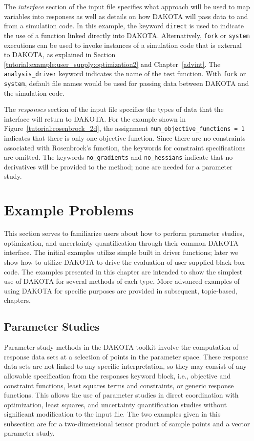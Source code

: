 The \emph{interface} section of the input file specifies what approach
will be used to map variables into responses as well as details on how
DAKOTA will pass data to and from a simulation code.
In this example, the keyword \texttt{direct} is used to indicate the
use of a function linked directly into DAKOTA.
Alternatively, \texttt{fork} or \texttt{system} executions can be used
to invoke instances of a simulation code that is external to DAKOTA,
as explained in Section \ref{tutorial:example:user_supply:optimization2} 
and Chapter~\ref{advint}.
The \texttt{analysis\_driver} keyword indicates the name of the test
function.  With \texttt{fork} or \texttt{system}, default file names
would be used for passing data between DAKOTA and the simulation code.

The \emph{responses} section of the input file specifies the types of
data that the interface will return to DAKOTA. For the example shown
in Figure~\ref{tutorial:rosenbrock_2d}, the assignment
\texttt{num\_objective\_functions = 1}
indicates that there is only one objective
function.  Since there are no constraints
associated with Rosenbrock's function, the keywords for
constraint specifications are omitted. The keywords
\texttt{no\_gradients} and \texttt{no\_hessians} indicate that no
derivatives will be provided to the method; none are needed for
a parameter study.

\section{Example Problems}\label{tutorial:example}

This section serves to familiarize users about how to perform parameter 
studies, optimization, and uncertainty quantification through their common
DAKOTA interface.  The initial examples utilize simple built in driver 
functions; later we show how to utilize DAKOTA to drive the evaluation of 
user supplied black box code.  The examples presented in this chapter 
are intended to show the simplest use of DAKOTA for several methods of 
each type.  More advanced examples of using DAKOTA for specific purposes 
are provided in subsequent, topic-based, chapters.

\subsection{Parameter Studies}\label{tutorial:example:param_study}

Parameter study methods in the DAKOTA toolkit involve the computation 
of response data sets at a selection of points in the parameter space. 
These response data sets are not linked to any specific interpretation,
so they may consist of any allowable specification from the responses 
keyword block, i.e., objective and constraint functions, least squares 
terms and constraints, or generic response functions. This allows the 
use of parameter studies in direct coordination with optimization, least 
squares, and uncertainty quantification studies without significant
modification to the input file.  
The two examples given in this subsection are for a two-dimensional 
tensor product of sample points and a vector parameter study.

